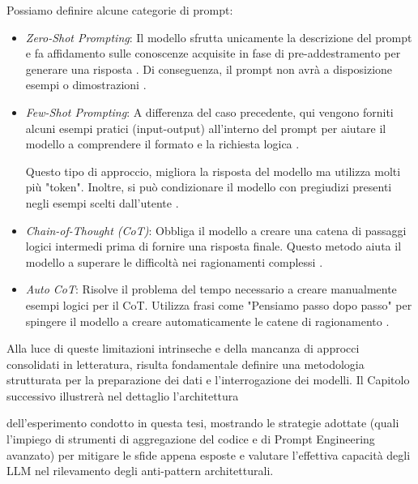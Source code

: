 Possiamo definire alcune categorie di prompt:
\begin{itemize}
    \item \textit{Zero-Shot Prompting}: Il modello sfrutta unicamente la descrizione del prompt e fa affidamento sulle conoscenze acquisite in fase di pre-addestramento per generare una risposta \cite{prompteng}. Di conseguenza, il prompt non avrà a disposizione esempi o dimostrazioni \cite{prompteng_github}.

    \item \textit{Few-Shot Prompting}: A differenza del caso precedente, qui vengono forniti alcuni esempi pratici (input-output) all'interno del prompt per aiutare il modello a comprendere il formato e la richiesta logica \cite{prompteng}. 

    Questo tipo di approccio, migliora la risposta del modello ma utilizza molti più "token". Inoltre, si può condizionare il modello con pregiudizi presenti negli esempi scelti dall'utente \cite{prompteng}.

    \item \textit{Chain-of-Thought (CoT)}: Obbliga il modello a creare una catena di passaggi logici intermedi prima di fornire una risposta finale. Questo metodo aiuta il modello a superare le difficoltà nei ragionamenti complessi \cite{prompteng}.

    \item \textit{Auto CoT}: Risolve il problema del tempo necessario a creare manualmente esempi logici per il CoT. Utilizza frasi come "Pensiamo passo dopo passo" per spingere il modello a creare automaticamente le catene di ragionamento \cite{prompteng}.
\end{itemize}


Alla luce di queste limitazioni intrinseche e della mancanza di approcci consolidati in letteratura, risulta fondamentale definire una metodologia strutturata per la preparazione dei dati e l'interrogazione dei modelli. Il Capitolo successivo illustrerà nel dettaglio l'architettura 

dell'esperimento condotto in questa tesi, mostrando le strategie adottate (quali l'impiego di strumenti di aggregazione del codice e di Prompt Engineering avanzato) per mitigare le sfide appena esposte e valutare l'effettiva capacità degli LLM nel rilevamento degli anti-pattern architetturali.